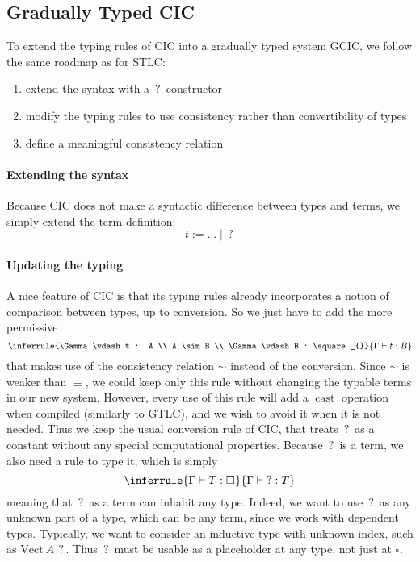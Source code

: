 \documentclass{kaobook}
\renewcommand{\mathtt}{\mathrm}
\newcommand{\uni}[1][]{\square_{#1}}
\newcommand{\cons}{\sim}
\newcommand{\conv}{\equiv}
\DeclareMathOperator{\?}{?}
\newcommand{\ve}{\mathtt{Vect}}
\newcommand{\cas}{\operatorname{\mathtt{cast}}}
\newcommand{\gcic}{GCIC}
\begin{document}
{\subsection{Gradually Typed CIC}
\label{gcicss}


To extend the typing rules of CIC into a gradually typed system \gcic, we follow the same roadmap as for STLC:
\begin{enumerate}
	\item extend the syntax with a $\?$ constructor
	\item modify the typing rules to use consistency rather than convertibility of types
	\item define a meaningful consistency relation
\end{enumerate}

\paragraph{Extending the syntax}

Because CIC does not make a syntactic difference between types and terms, we simply extend the term definition:
\[t := \dots \mid \? \]

\paragraph{Updating the typing}

A nice feature of CIC is that its typing rules already incorporates a notion of comparison between types, up to conversion. So we just have to add the more permissive
\[\inferrule{\Gamma \vdash t : A \\ A \cons B \\ \Gamma \vdash B : \uni}{\Gamma \vdash t : B} \]
that makes use of the consistency relation $\cons$ instead of the conversion. Since $\cons$ is weaker than $\conv$, we could keep only this rule without changing the typable terms in our new system. However, every use of this rule will add a $\cas$ operation when compiled (similarly to GTLC), and we wish to avoid it when it is not needed. Thus we keep the usual conversion rule of CIC, that treats $\?$ as a constant without any special computational properties.
Because $\?$ is a term, we also need a rule to type it, which is simply
\[\inferrule{\Gamma \vdash T : \uni}{\Gamma \vdash \? : T} \]
meaning that $\?$ as a term can inhabit any type. Indeed, we want to use $\?$ as any unknown part of a type, which can be any term, since we work with dependent types. Typically, we want to consider an inductive type with unknown index, such as $\ve~A~\?$. Thus $\?$ must be usable as a placeholder at any type, not just at $\uni$.

}
\end{document}
